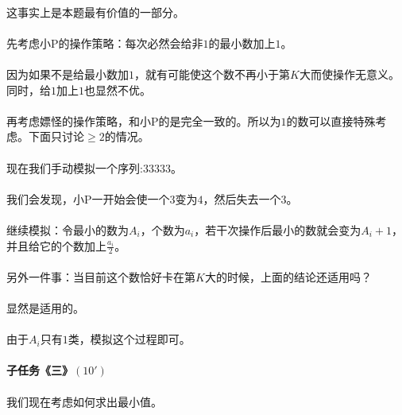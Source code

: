\documentclass[UTF8]{ctexart}
\begin{document}
\paragraph{}这事实上是本题最有价值的一部分。
\paragraph{}先考虑小P的操作策略：每次必然会给非$1$的最小数加上$1$。
\paragraph{}因为如果不是给最小数加$1$，就有可能使这个数不再小于第$K$大而使操作无意义。同时，给$1$加上$1$也显然不优。
\paragraph{}再考虑嫖怪的操作策略，和小P的是完全一致的。所以为$1$的数可以直接特殊考虑。下面只讨论$\geq 2$的情况。
\paragraph{}现在我们手动模拟一个序列:$3 3 3 3 3$。
\paragraph{}我们会发现，小P一开始会使一个$3$变为$4$，然后失去一个$3$。
\paragraph{}继续模拟：令最小的数为$A_i$，个数为$a_i$，若干次操作后最小的数就会变为$A_i+1$，并且给它的个数加上$\frac{a_i}{2}$。
\paragraph{}另外一件事：当目前这个数恰好卡在第$K$大的时候，上面的结论还适用吗？
\paragraph{}显然是适用的。
\paragraph{}由于$A_i$只有$1$类，模拟这个过程即可。
\paragraph{子任务《三》$(10')$}
\paragraph{}我们现在考虑如何求出最小值。
\end{document}
